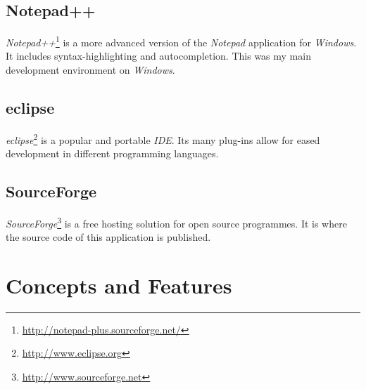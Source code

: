 \documentclass[12pt,a4paper,twoside,openany]{report}
\begin{document}
\subsection{Notepad++}
\label{npp}
\textit{Notepad++}\footnote{\url{http://notepad-plus.sourceforge.net/}} is a
more advanced version of the \textit{Notepad} application for
\textit{Windows\texttrademark}. It includes syntax-highlighting and
autocompletion. This was my main development environment on
\textit{Windows\texttrademark}.

\subsection{eclipse}
\label{eclipse}
\textit{eclipse}\footnote{\url{http://www.eclipse.org}} is a popular and
portable \textit{IDE}. Its many plug-ins allow for eased development in
different programming languages.

\subsection{SourceForge}
\label{sf}
\textit{SourceForge}\footnote{\url{http://www.sourceforge.net}} is a free
hosting solution for open source programmes. It is where the source code of this
application is published.

\section{Concepts and Features}
\end{document}
